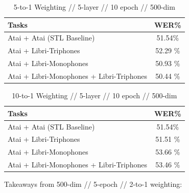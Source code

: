 \documentclass[a4paper]{article}
\begin{document}
\begin{table}[!htbp]
  \centering
    \caption{5-to-1 Weighting // 5-layer // 10 epoch // 500-dim}
  \begin{adjustbox}{width=.45\textwidth}
    \begin{tabular}{lc}
      \toprule
      \textbf{Tasks} & \textbf{WER\%}\\
      \midrule
      Atai + Atai (STL Baseline) &  51.54\% \\
      Atai + Libri-Triphones & 52.29 \%  \\
      Atai + Libri-Monophones & 50.93 \% \\
      Atai + Libri-Monophones + Libri-Triphones & 50.44 \%  \\
      \bottomrule
    \end{tabular}
    \label{table:data}
  \end{adjustbox}
\end{table}



\begin{table}[!htbp]
  \centering
    \caption{10-to-1 Weighting // 5-layer // 10 epoch // 500-dim}
  \begin{adjustbox}{width=.45\textwidth}
    \begin{tabular}{lc}
      \toprule
      \textbf{Tasks} & \textbf{WER\%}\\
      \midrule
      Atai + Atai (STL Baseline) &  51.54\% \\
      Atai + Libri-Triphones & 51.51 \%  \\
      Atai + Libri-Monophones & 53.66 \% \\
      Atai + Libri-Monophones + Libri-Triphones & 53.46 \%  \\
      \bottomrule
    \end{tabular}
    \label{table:data}
  \end{adjustbox}
\end{table}



Takeaways from 500-dim // 5-epoch // 2-to-1 weighting:
\end{document}
